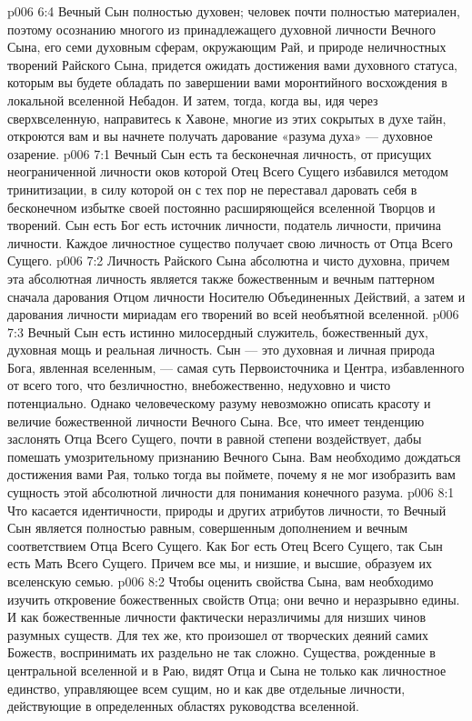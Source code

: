 \vs p006 6:4 Вечный Сын полностью духовен; человек почти полностью материален, поэтому осознанию многого из принадлежащего духовной личности Вечного Сына, его семи духовным сферам, окружающим Рай, и природе неличностных творений Райского Сына, придется ожидать достижения вами духовного статуса, которым вы будете обладать по завершении вами моронтийного восхождения в локальной вселенной Небадон. И затем, тогда, когда вы, идя через сверхвселенную, направитесь к Хавоне, многие из этих сокрытых в духе тайн, откроются вам и вы начнете получать дарование «разума духа» --- духовное озарение.
\vs p006 7:1 Вечный Сын есть та бесконечная личность, от присущих неограниченной личности оков которой Отец Всего Сущего избавился методом тринитизации, в силу которой он с тех пор не переставал даровать себя в бесконечном избытке своей постоянно расширяющейся вселенной Творцов и творений. Сын есть  Бог есть  источник личности, податель личности, причина личности. Каждое личностное существо получает свою личность от Отца Всего Сущего.
\vs p006 7:2 Личность Райского Сына абсолютна и чисто духовна, причем эта абсолютная личность является также божественным и вечным паттерном сначала дарования Отцом личности Носителю Объединенных Действий, а затем и дарования личности мириадам его творений во всей необъятной вселенной.
\vs p006 7:3 Вечный Сын есть истинно милосердный служитель, божественный дух, духовная мощь и реальная личность. Сын --- это духовная и личная природа Бога, явленная вселенным, --- самая суть Первоисточника и Центра, избавленного от всего того, что безличностно, внебожественно, недуховно и чисто потенциально. Однако человеческому разуму невозможно описать красоту и величие божественной личности Вечного Сына. Все, что имеет тенденцию заслонять Отца Всего Сущего, почти в равной степени воздействует, дабы помешать умозрительному признанию Вечного Сына. Вам необходимо дождаться достижения вами Рая, только тогда вы поймете, почему я не мог изобразить вам сущность этой абсолютной личности для понимания конечного разума.
\vs p006 8:1 Что касается идентичности, природы и других атрибутов личности, то Вечный Сын является полностью равным, совершенным дополнением и вечным соответствием Отца Всего Сущего. Как Бог есть Отец Всего Сущего, так Сын есть Мать Всего Сущего. Причем все мы, и низшие, и высшие, образуем их вселенскую семью.
\vs p006 8:2 Чтобы оценить свойства Сына, вам необходимо изучить откровение божественных свойств Отца; они вечно и неразрывно едины. И как божественные личности фактически неразличимы для низших чинов разумных существ. Для тех же, кто произошел от творческих деяний самих Божеств, воспринимать их раздельно не так сложно. Существа, рожденные в центральной вселенной и в Раю, видят Отца и Сына не только как личностное единство, управляющее всем сущим, но и как две отдельные личности, действующие в определенных областях руководства вселенной.

